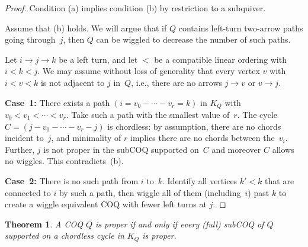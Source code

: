 \documentclass[11pt, letterpaper]{amsart}
\newcommand{\cS}[1]{{\noindent\textsf{\color{purple}$\blacksquare$~#1~$\blacksquare$}}}
\newtheorem{theorem}{Theorem}[section]
\theoremstyle{definition}
\numberwithin{equation}{section}
\def\wind{{\operatorname{wind}}}
\newcommand\GQ{K_Q}
\begin{document}
\begin{proof}
Condition (a) implies condition (b) by restriction to a subquiver. 

Assume that (b) holds. 
We will argue that if $Q$ contains left-turn two-arrow paths going through~$j$,
then $Q$ can be wiggled to decrease the number of such paths. 


Let $i \rightarrow j \rightarrow k$ be a left turn, and let $<$ be a compatible linear ordering with $i < k < j$. 
We may assume without loss of generality that every vertex $v$ with $i < v < k$ is not adjacent to $j$ in~$Q$,
i.e., there are no arrows $j\to v$ or $v\to j$. 

\noindent

\textbf{Case~1:} 
There exists a path ${(i = v_0 - \cdots - v_r= k)}$ in $K_Q$ with $v_0 < v_1 < \cdots < v_r$.
Take such a path with the smallest value of~$r$.
The cycle $C = (j - v_0 - \cdots - v_r - j)$ is chordless: 
by assumption, there are no chords incident to~$j$, 
and minimality of $r$ implies there are no chords between the~$v_i$.  
Further, $j$ is not proper in the subCOQ supported on~$C$ 
and moreover $C$ allows no wiggles. %
This contradicts~(b).

\textbf{Case~2:} 
There is no such path from $i$ to~$k$. 
Identify all vertices $k'<k$ that are connected to $i$ by such a path, 
then wiggle all of them (including~$i$) past $k$ to create a wiggle equivalent COQ with fewer left turns at $j$. 
\end{proof}

\begin{theorem}
\label{th:small winding proper}
A COQ $Q$ is proper if and only if every (full) subCOQ of $Q$ supported on a 
chordless cycle in $\GQ$ is proper. 
\end{theorem}
\end{document}
